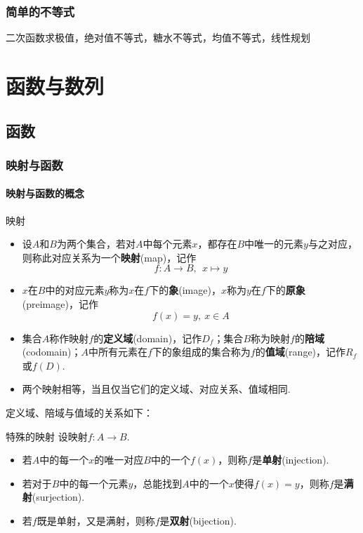 \documentclass[lang=cn, zihao=5]{elegantbook}
\begin{document}
\section{简单的不等式}

二次函数求极值，绝对值不等式，糖水不等式，均值不等式，线性规划

\part{函数与数列}

\chapter{函数}

\section{映射与函数}

\subsection{映射与函数的概念}

\begin{definition}{映射}
	\begin{itemize}
		\item 设$A$和$B$为两个集合，若对$A$中每个元素$x$，都存在$B$中唯一的元素$y$与之对应，则称此对应关系为一个\textbf{映射}(map)，记作$$f:A \to B,~~x \mapsto y$$
		\item $x$在$B$中的对应元素$y$称为$x$在$f$下的\textbf{象}(image)，$x$称为$y$在$f$下的\textbf{原象}(preimage)，记作$$f(x) = y,~ x \in A$$
		\item 集合$A$称作映射$f$的\textbf{定义域}(domain)，记作$D_f$；集合$B$称为映射$f$的\textbf{陪域}(codomain)；$A$中所有元素在$f$下的象组成的集合称为$f$的\textbf{值域}(range)，记作$R_f$或$f(D)$.
		\item 两个映射相等，当且仅当它们的定义域、对应关系、值域相同.
	\end{itemize}
\end{definition}

定义域、陪域与值域的关系如下：


\begin{definition}{特殊的映射}
	设映射$f:A \to B$.
	\begin{itemize}
		\item 若$A$中的每一个$x$的唯一对应$B$中的一个$f(x)$，则称$f$是\textbf{单射}(injection).
		\item 若对于$B$中的每一个元素$y$，总能找到$A$中的一个$x$使得$f(x)=y$，则称$f$是\textbf{满射}(surjection).
		\item 若$f$既是单射，又是满射，则称$f$是\textbf{双射}(bijection).
	\end{itemize}
\end{definition}
\end{document}
